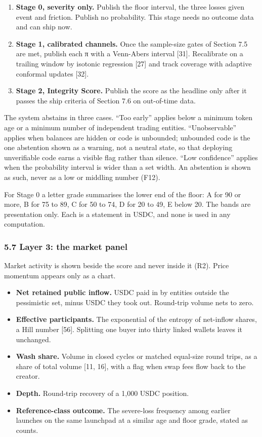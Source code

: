 \begin{enumerate}
\def\labelenumi{\arabic{enumi}.}
\tightlist
\item
  \textbf{Stage 0, severity only.} Publish the floor interval, the three losses given event and friction. Publish no probability. This stage needs no outcome data and can ship now.
\item
  \textbf{Stage 1, calibrated channels.} Once the sample-size gates of Section 7.5 are met, publish each π with a Venn-Abers interval {[}31{]}. Recalibrate on a trailing window by isotonic regression {[}27{]} and track coverage with adaptive conformal updates {[}32{]}.
\item
  \textbf{Stage 2, Integrity Score.} Publish the score as the headline only after it passes the ship criteria of Section 7.6 on out-of-time data.
\end{enumerate}

The system abstains in three cases. ``Too early'' applies below a minimum token age or a minimum number of independent trading entities. ``Unobservable'' applies when balances are hidden or code is unbounded; unbounded code is the one abstention shown as a warning, not a neutral state, so that deploying unverifiable code earns a visible flag rather than silence. ``Low confidence'' applies when the probability interval is wider than a set width. An abstention is shown as such, never as a low or middling number (F12).

For Stage 0 a letter grade summarises the lower end of the floor: A for 90 or more, B for 75 to 89, C for 50 to 74, D for 20 to 49, E below 20. The bands are presentation only. Each is a statement in USDC, and none is used in any computation.

\subsubsection{5.7 Layer 3: the market panel}\label{layer-3-the-market-panel}

Market activity is shown beside the score and never inside it (R2). Price momentum appears only as a chart.

\begin{itemize}
\tightlist
\item
  \textbf{Net retained public inflow.} USDC paid in by entities outside the pessimistic set, minus USDC they took out. Round-trip volume nets to zero.
\item
  \textbf{Effective participants.} The exponential of the entropy of net-inflow shares, a Hill number {[}56{]}. Splitting one buyer into thirty linked wallets leaves it unchanged.
\item
  \textbf{Wash share.} Volume in closed cycles or matched equal-size round trips, as a share of total volume {[}11, 16{]}, with a flag when swap fees flow back to the creator.
\item
  \textbf{Depth.} Round-trip recovery of a 1,000 USDC position.
\item
  \textbf{Reference-class outcome.} The severe-loss frequency among earlier launches on the same launchpad at a similar age and floor grade, stated as counts.
\end{itemize}

